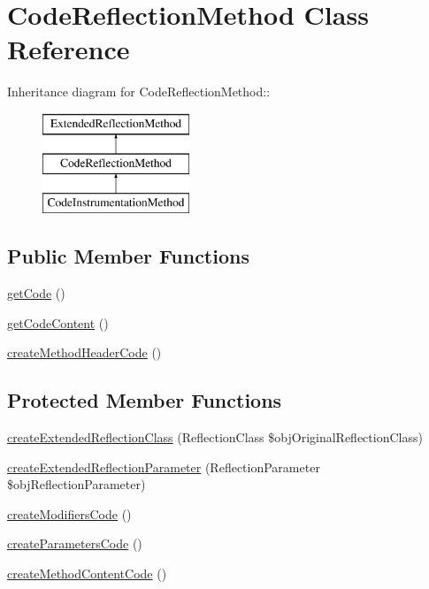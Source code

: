 \hypertarget{class_code_reflection_method}{
\section{CodeReflectionMethod Class Reference}
\label{class_code_reflection_method}
}
Inheritance diagram for CodeReflectionMethod::\begin{figure}[H]
\begin{center}
\leavevmode
\includegraphics[height=3cm]{class_code_reflection_method}
\end{center}
\end{figure}
\subsection*{Public Member Functions}
\begin{CompactItemize}
\item 
\hyperlink{class_code_reflection_method_b5e24da53b4a0d0848b18c1e832f47ff}{getCode} ()
\item 
\hyperlink{class_code_reflection_method_5796d91d5436d3d7e80b65f0913f1873}{getCodeContent} ()
\item 
\hyperlink{class_code_reflection_method_3d517292204047acfc6bb54cc09a38e3}{createMethodHeaderCode} ()
\end{CompactItemize}
\subsection*{Protected Member Functions}
\begin{CompactItemize}
\item 
\hyperlink{class_code_reflection_method_6b56ec198bc6a5b5a72076e4e7c19e29}{createExtendedReflectionClass} (ReflectionClass \$objOriginalReflectionClass)
\item 
\hyperlink{class_code_reflection_method_98ceb248f2b535a3a83ac2e7990e0c1f}{createExtendedReflectionParameter} (ReflectionParameter \$objReflectionParameter)
\item 
\hyperlink{class_code_reflection_method_17316de2d114d63b0c66ce8c81cb948e}{createModifiersCode} ()
\item 
\hyperlink{class_code_reflection_method_bcae75d179d0d3b4c5d5aafcd3f3bcdc}{createParametersCode} ()
\item 
\hyperlink{class_code_reflection_method_e38c2891dc093dabb6b363a4de9ac495}{createMethodContentCode} ()
\end{CompactItemize}


